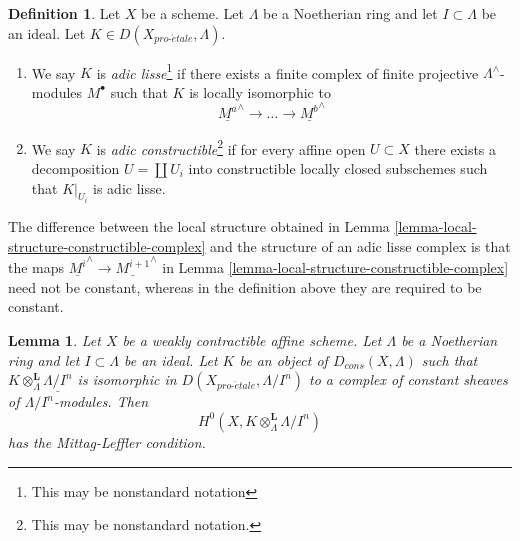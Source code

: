 \documentclass{stacks-project}
\theoremstyle{plain}
\newtheorem{lemma}[subsection]{Lemma}
\theoremstyle{definition}
\newtheorem{definition}[subsection]{Definition}
\theoremstyle{remark}
\numberwithin{equation}{subsection}
\def\proetale{{pro\text{-}\acute{e}tale}}
\begin{document}
\begin{definition}
\label{definition-adic-constructible}
Let $X$ be a scheme. Let $\Lambda$ be a Noetherian ring and let
$I \subset \Lambda$ be an ideal. Let $K \in D(X_\proetale, \Lambda)$.
\begin{enumerate}
\item We say $K$ is {\it adic lisse}\footnote{This may be
nonstandard notation} if there exists a finite complex of finite
projective $\Lambda^\wedge$-modules $M^\bullet$ such that
$K$ is locally isomorphic to
$$
\underline{M^a}^\wedge \to \ldots \to \underline{M^b}^\wedge
$$
\item We say $K$ is {\it adic constructible}\footnote{This may be
nonstandard notation.} if for every affine open $U \subset X$
there exists a decomposition $U = \coprod U_i$ into
constructible locally closed subschemes such that $K|_{U_i}$
is adic lisse.
\end{enumerate}
\end{definition}

\noindent
The difference between the local structure obtained in
Lemma \ref{lemma-local-structure-constructible-complex}
and the structure of an adic lisse complex is that
the maps $\underline{M^i}^\wedge \to \underline{M^{i + 1}}^\wedge$ in 
Lemma \ref{lemma-local-structure-constructible-complex}
need not be constant, whereas in the definition above they
are required to be constant.

\begin{lemma}
\label{lemma-weakly-contractible-locally-constant-ML}
Let $X$ be a weakly contractible affine scheme. Let $\Lambda$ be a Noetherian
ring and let $I \subset \Lambda$ be an ideal. Let $K$ be an object of
$D_{cons}(X, \Lambda)$ such that
$K \otimes_\Lambda^\mathbf{L} \underline{\Lambda/I^n}$
is isomorphic in $D(X_\proetale, \Lambda/I^n)$ to a
complex of constant sheaves of $\Lambda/I^n$-modules. Then
$$
H^0(X, K \otimes_\Lambda^\mathbf{L} \Lambda/I^n)
$$
has the Mittag-Leffler condition.
\end{lemma}
\end{document}
